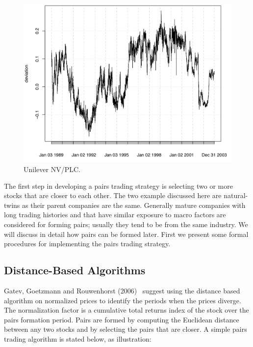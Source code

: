 	\begin{figure}[!ht]
	\centering
	\includegraphics[width=\textwidth]{chapters/chapter_stat_ts/figures/472.png}
	\caption{Unilever NV/PLC. \label{fig:3nvplc}}
	\end{figure}

The first step in developing a pairs trading strategy is selecting two or more stocks that are closer to each other. The two example discussed here are natural-twins as their parent companies are the same. Generally mature companies with long trading histories and that have similar exposure to macro factors are considered for forming pairs; usually they tend to be from the same industry. We will discuss in detail how pairs can be formed later. First we present some formal procedures for implementing the pairs trading strategy.


\subsection{Distance-Based Algorithms}


Gatev, Goetzmann and Rouwenhorst (2006)~\cite{ggr} suggest using the distance based algorithm on normalized prices to identify the periods when the prices diverge. The normalization factor is a cumulative total returns index of the stock over the pairs formation period. Pairs are formed by computing the Euclidean distance between any two stocks and by selecting the pairs that are closer. A simple pairs trading algorithm is stated below, as illustration: \\

